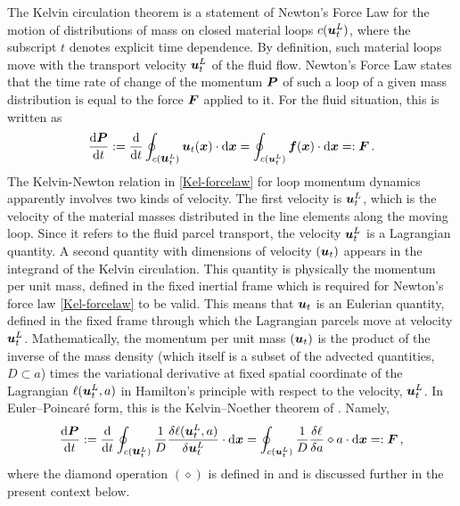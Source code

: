 \documentclass[11pt, oneside]{article}   	%
\numberwithin{equation}{section}
\theoremstyle{plain}
\theoremstyle{definition}
\theoremstyle{remark}
\newcommand{\<}{\langle}
\renewcommand{\>}{\rangle}
\def\diff{\textnormal{d}}
\def\rmd{{\mathrm{d}}}
\newcommand{\mb}[1]{\mbox{\boldmath{$#1$}}}
\newcommand{\mbs}[1]{\boldsymbol{#1}}
\begin{document}
The Kelvin circulation theorem is a statement of Newton's Force Law for the motion of distributions of mass on closed material loops $c(\mb{u}_t^L)$, where the subscript $t$ denotes explicit time dependence. By definition, such material loops move with the transport velocity $\mb{u}_t^L$ of the fluid flow. Newton's Force Law states that the time rate of change of the momentum $\mb{P}$ of such a loop of a given mass distribution is equal to the force $\mb{F}$ applied to it. For the fluid situation, this is written as
\begin{align}
\frac{\diff \mb{P}}{\diff t} := \frac{\diff}{\diff t}\oint_{c(\mb{u}_t^L)} \mb{u}_t(\mb x)\cdot {\rmd} \mb x
= \oint_{c(\mbs{u}_t^L)} \mb{f}(\mb x)\cdot {\rmd} \mb x =: \mb{F}
\,.
\label{Kel-forcelaw}
\end{align}
The Kelvin-Newton relation in \eqref{Kel-forcelaw} for loop momentum dynamics apparently involves two kinds of velocity. The first velocity is $\mb{u}_t^L$, which is the velocity of the material masses distributed in the line elements along the moving loop. Since it refers to the fluid parcel transport, the velocity $\mb{u}_t^L$ is a Lagrangian quantity. A second quantity with dimensions of velocity $(\mb{u}_t)$ appears in the integrand of the Kelvin circulation. This quantity is physically the momentum per unit mass, defined in the fixed inertial frame which is required for Newton's force law \eqref{Kel-forcelaw} to be valid. This means that $\mb{u}_t$ is an Eulerian quantity, defined in the fixed frame through which the Lagrangian parcels move at velocity $\mb{u}_t^L$. Mathematically, the momentum per unit mass $(\mb{u}_t)$ is the product of the  inverse of the mass density (which itself is a subset of the advected quantities, $D\subset a$) times the variational derivative at fixed spatial coordinate of the Lagrangian $\ell(\mb{u}_t^L,a)$ in Hamilton's principle with respect to the velocity, $\mb{u}_t^L$. In Euler--Poincar\'e form, this is the Kelvin--Noether theorem of \cite{HMR1998}. Namely,  
\begin{align}
\frac{\diff \mb{P}}{\diff t} 
:= \frac{\diff}{\diff t}\oint_{c(\mb{u}_t^L)}
\frac{1}{D}\frac{\delta \ell(\mbs{u}_t^L,a)}{\delta \mb{u}_t^L}\cdot {\rmd} \mb x
= \oint_{c(\mbs{u}_t^L)} \frac{1}{D} \frac{\delta \ell}{\delta a}\diamond a \cdot {\rmd} \mb x =: \mb{F}
\,,
\label{KelNoether-forcelaw}
\end{align}
where the diamond operation $(\diamond)$ is defined in \cite{HMR1998} and is discussed further in the present context below. 
\end{document}
